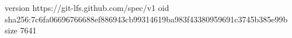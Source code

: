 version https://git-lfs.github.com/spec/v1
oid sha256:7c6fa06696766688ef886943cb99314619ba983f43380959691c3745b385e99b
size 7641
